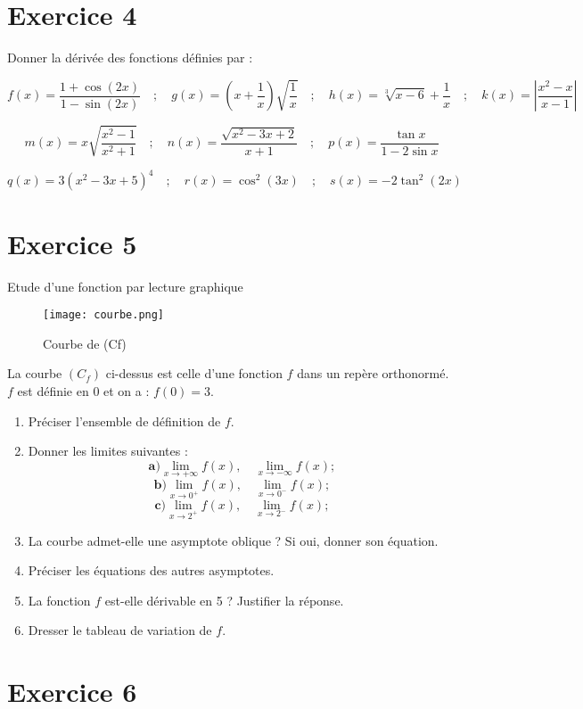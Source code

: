 \documentclass[12pt]{article}
\begin{document}
\section*{Exercice 4}


Donner la dérivée des fonctions définies par :

\[
f(x) = \frac{1 + \cos(2x)}{1 - \sin(2x)} \quad ; \quad
g(x) = \left( x + \dfrac{1}{x} \right) \sqrt{\dfrac{1}{x}} \quad ; \quad
h(x) = \sqrt[3]{x - 6} + \dfrac{1}{x} \quad ; \quad
k(x) = \left| \dfrac{x^2 - x}{x - 1} \right|
\]

\[
m(x) = x \sqrt{\dfrac{x^2 - 1}{x^2 + 1}} \quad ; \quad
n(x) = \dfrac{\sqrt{x^2 - 3x + 2}}{x + 1} \quad ; \quad
p(x) = \dfrac{\tan x}{1 - 2 \sin x}
\]

\[
q(x) = 3 \left( x^2 - 3x + 5 \right)^4 \quad ; \quad
r(x) = \cos^2(3x) \quad ; \quad
s(x) = -2 \tan^2(2x)
\]
\newpage
\section*{Exercice 5}
Etude d'une fonction par lecture graphique
\begin{figure}[h]
\centering
\texttt{[image: courbe.png]}
\caption{Courbe de (Cf)}
\label{fig:monimage}
\end{figure}
La courbe $(C_f)$ ci-dessus est celle d'une fonction $f$ dans un repère orthonormé. $f$ est définie en 0 et on a : $f(0) = 3$.

\begin{enumerate}
    \item Préciser l'ensemble de définition de $f$.
    \item Donner les limites suivantes :
    \[
    \textbf{a)} \lim_{x \to +\infty} f(x), \quad \lim_{x \to -\infty} f(x) ;
    \]
    \[
    \textbf{b)} \lim_{x \to 0^+} f(x), \quad \lim_{x \to 0^-} f(x) ;
    \]
    \[
    \textbf{c)} \lim_{x \to 2^+} f(x), \quad \lim_{x \to 2^-} f(x) ;
    \]
    \item La courbe admet-elle une asymptote oblique ? Si oui, donner son équation.
    \item Préciser les équations des autres asymptotes.
    \item La fonction $f$ est-elle dérivable en 5 ? Justifier la réponse.
    \item Dresser le tableau de variation de $f$.
\end{enumerate}

\section*{Exercice 6}
\end{document}
